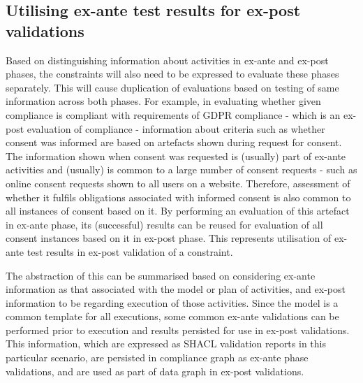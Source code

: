 \subsection{Utilising ex-ante test results for ex-post validations}\label{sec:testing:shacl:combine}
Based on distinguishing information about activities in ex-ante and ex-post phases, the constraints will also need to be expressed to evaluate these phases separately.
This will cause duplication of evaluations based on testing of same information across both phases. 
For example, in evaluating whether given compliance is compliant with requirements of GDPR compliance - which is an ex-post evaluation of compliance - information about criteria such as whether consent was informed are based on artefacts shown during request for consent. The information shown when consent was requested is (usually) part of ex-ante activities and (usually) is common to a large number of consent requests - such as online consent requests shown to all users on a website. Therefore, assessment of whether it fulfils obligations associated with informed consent is also common to all instances of consent based on it. 
By performing an evaluation of this artefact in ex-ante phase, its (successful) results can be reused for evaluation of all consent instances based on it in ex-post phase.
This represents utilisation of ex-ante test results in ex-post validation of a constraint.

The abstraction of this can be summarised based on considering ex-ante information as that associated with the model or plan of activities, and ex-post information to be regarding execution of those activities. Since the model is a common template for all executions, some common ex-ante validations can be performed prior to execution and results persisted for use in ex-post validations.
This information, which are expressed as SHACL validation reports in this particular scenario, are persisted in compliance graph as ex-ante phase validations, and are used as part of data graph in ex-post validations.

